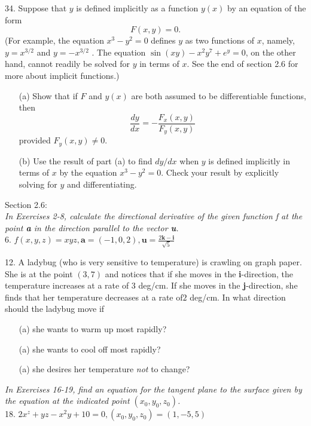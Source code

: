 \documentclass[12pt,letterpaper]{hmcpset}
\begin{document}
\begin{problem}
34. Suppose that $y$ is defined implicitly as a function $y(x)$
by an equation of the form
\begin{equation}
    F(x, y) = 0.
\end{equation}
(For example, the equation $x^3 - y^2 = 0$ defines $y$ as
two functions of $x$, namely, $y = x^{3/2}$ and $y = -x^{3/2}$ .
The equation $\sin(xy) - x^2y^7 + e^y = 0$, on the other
hand, cannot readily be solved for $y$ in terms of $x$. See
the end of section 2.6 for more about implicit functions.)

\begin{enumerate}
    \item[(a)] Show that if $F$ and $y(x)$ are both assumed to be
differentiable functions, then
\begin{equation}
    \frac{dy}{dx}=-\frac{F_x(x,y)}{F_y(x,y)}
\end{equation}
provided $F_y(x,y)\neq0$.

    \item[(b)] Use the result of part (a) to find $dy/dx$ when $y$
is defined implicitly in terms of $x$ by the equation $x^3 - y^2 = 0$. Check your result by explicitly
solving for $y$ and differentiating.
\end{enumerate}
\end{problem}

\newpage


\begin{problem}
Section 2.6:
\\
\textit{In Exercises 2-8, calculate the directional derivative of the
given function f at the point \textbf{a} in the direction parallel to the
vector \textbf{u}.}
\\
6. $ f (x, y, z) = xyz, \mathbf{a} = (-1, 0, 2), \mathbf{u}=\frac{2\mathbf{k}-\mathbf{i}}{\sqrt{5}}$
\end{problem}

\newpage


\begin{problem}
12. A ladybug (who is very sensitive to temperature) is
crawling on graph paper. She is at the point $(3, 7)$ and
notices that if she moves in the \textbf{i}-direction, the temperature increases at a rate of $3$ deg/cm. If she moves
in the \textbf{j}-direction, she finds that her temperature decreases at a rate of$2$ deg/cm. In what direction should
the ladybug move if
\begin{enumerate}
    \item[(a)] she wants to warm up most rapidly?
    \item[(a)] she wants to cool off most rapidly? 
    \item[(a)] she desires her temperature \textit{not} to change? 
\end{enumerate}
\end{problem}

\newpage


\begin{problem}
\textit{In Exercises 16-19, find an equation for the tangent plane to
the surface given by the equation at the indicated point $(x_0, y_0,
z_0)$.}
\\
18. $2x^z + yz - x^2 y + 10 = 0, (x_0 , y_0 , z_0 ) = (1, -5, 5)$
\end{problem}
\end{document}
